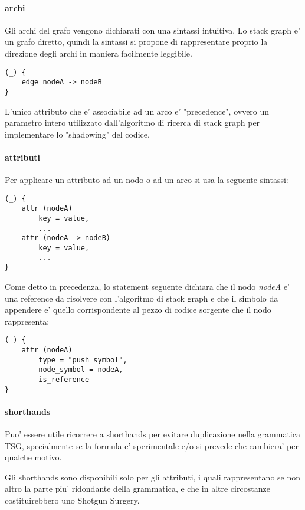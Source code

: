 \paragraph{archi}

Gli archi del grafo vengono dichiarati con una sintassi intuitiva.
Lo stack graph e' un grafo diretto, quindi la sintassi si propone di rappresentare proprio la direzione degli archi in maniera facilmente leggibile.

\begin{verbatim}
(_) {
    edge nodeA -> nodeB
}
\end{verbatim}

L'unico attributo che e' associabile ad un arco e' "precedence", ovvero un parametro intero utilizzato dall'algoritmo di ricerca di stack graph per implementare lo "shadowing" del codice.

\paragraph{attributi}

Per applicare un attributo ad un nodo o ad un arco si usa la seguente sintassi:

\begin{verbatim}
(_) {
    attr (nodeA)
        key = value,
        ...
    attr (nodeA -> nodeB)
        key = value,
        ...
}
\end{verbatim}

Come detto in precedenza, lo statement seguente dichiara che il nodo \emph{nodeA} e' una reference da risolvere con l'algoritmo di stack graph e che il simbolo da appendere e' quello corrispondente al pezzo di codice sorgente che il nodo rappresenta:

\begin{verbatim}
(_) {
    attr (nodeA)
        type = "push_symbol",
        node_symbol = nodeA,
        is_reference
}
\end{verbatim}

\paragraph{shorthands}
Puo' essere utile ricorrere a shorthands per evitare duplicazione nella grammatica TSG, specialmente se la formula e' sperimentale e/o si prevede che cambiera' per qualche motivo.

Gli shorthands sono disponibili solo per gli attributi, i quali rappresentano se non altro la parte piu' ridondante della grammatica, e che in altre circostanze costituirebbero uno Shotgun Surgery.

